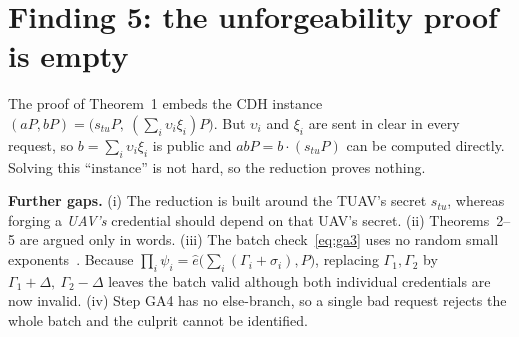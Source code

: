 \section{Finding 5: the unforgeability proof is empty}
\begin{flawbox}[title={Theorem 1 reduces to a problem that is not hard}]
\begin{finding}\label{f:proof}
The proof of Theorem~1 embeds the CDH instance $(aP,bP)=\big(s_{tu}P,\ (\sum_i\upsilon_i\xi_i)P\big)$. But $\upsilon_i$ and $\xi_i$ are sent in clear in
every request, so $b=\sum_i\upsilon_i\xi_i$ is public and $abP=b\cdot(s_{tu}P)$ can be computed directly. Solving this ``instance'' is
not hard, so the reduction proves nothing.
\end{finding}
\textbf{Further gaps.} (i) The reduction is built around the TUAV's secret $s_{tu}$, whereas forging a \emph{UAV's} credential should depend on that
UAV's secret. (ii) Theorems~2--5 are argued only in words. (iii) The batch check~\eqref{eq:ga3} uses no random small exponents~\cite{bgr}. Because
$\prod_i\psi_i=\hat e\big(\sum_i(\Gamma_i+\sigma_i),P\big)$, replacing $\Gamma_1,\Gamma_2$ by $\Gamma_1+\Delta,\ \Gamma_2-\Delta$ leaves the batch valid
although both individual credentials are now invalid. (iv) Step GA4 has no else-branch, so a single bad request rejects the whole batch and the
culprit cannot be identified.
\end{flawbox}

